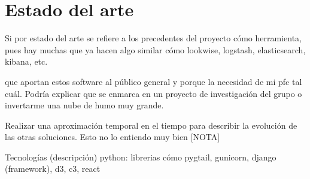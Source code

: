 \chapter{Estado del arte}
\label{chap:estado del arte}

Si por estado del arte se refiere a los precedentes del proyecto cómo herramienta, pues hay muchas que ya hacen algo similar cómo lookwise, logstash, elasticsearch, kibana, etc.

que aportan estos software al público general y porque la necesidad de mi pfc tal cuál. Podría explicar que se enmarca en un proyecto de investigación del grupo o invertarme una nube de humo muy grande.

Realizar una aproximación temporal en el tiempo para describir la evolución de las otras soluciones. Esto no lo entiendo muy bien [NOTA]

Tecnologías (descripción)
python: librerias cómo pygtail, gunicorn, django (framework), d3, c3, react
